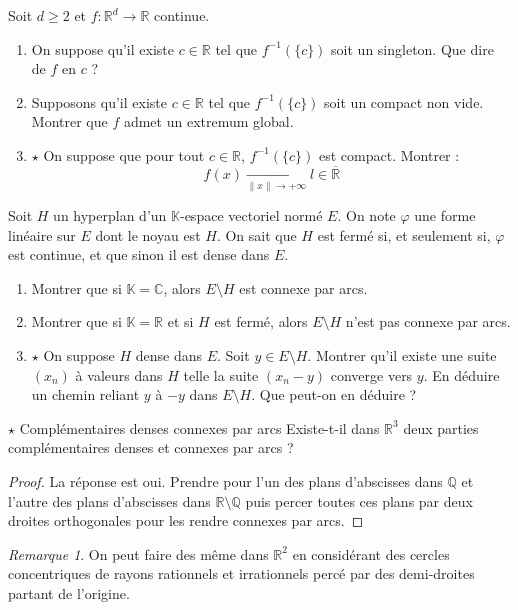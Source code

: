 \documentclass[french,a4paper]{article}
\newcommand{\Q}{\mathbb{Q}}
\newcommand{\R}{\mathbb{R}}
\newcommand{\C}{\mathbb{C}}
\newcommand{\K}{\mathbb{K}}
\newcommand{\inv}{^{-1}}
\theoremstyle{plain}
\theoremstyle{definition}
\theoremstyle{remark}
\newtheorem*{rmq}{Remarque}
\begin{document}
\begin{ex}[Moulin.41]{}
	Soit $d\geqslant 2$ et $f:\R^d\to\R$ continue.
	\begin{enumerate}
		\item On suppose qu'il existe $c\in\R$ tel que $f\inv(\{c\})$ soit un singleton. Que dire de $f$ en $c$ ?
		\item Supposons qu'il existe $c\in\R$ tel que $f\inv(\{c\})$ soit un compact non vide. Montrer que $f$ admet un extremum global.
		\item $\star$ On suppose que pour tout $c\in\R$, $f\inv(\{c\})$ est compact. Montrer : $$f(x)\xrightarrow[\lVert x\rVert\to+\infty]{}l\in\overline{\R}$$
	\end{enumerate}
\end{ex}

\begin{ex}[Moulin.42]{}
	Soit $H$ un hyperplan d'un $\K$-espace vectoriel normé $E$. On note $\varphi$ une forme linéaire sur $E$ dont le noyau est $H$. On sait que $H$ est fermé si, et seulement si, $\varphi$ est continue, et que sinon il est dense dans $E$.
	\begin{enumerate}
		\item Montrer que si $\K=\C$, alors $E\setminus H$ est connexe par arcs.
		\item Montrer que si $\K=\R$ et si $H$ est fermé, alors $E\setminus H$ n'est pas connexe par arcs.
		\item $\star$ On suppose $H$ dense dans $E$. Soit $y\in E\setminus H$. Montrer qu'il existe une suite $(x_n)$ à valeurs dans $H$ telle la suite $(x_n-y)$ converge vers $y$. En déduire un chemin reliant $y$ à $-y$ dans $E\setminus H$. Que peut-on en déduire ?
	\end{enumerate}
\end{ex}

\begin{ex}[Moulin.43]{$\star$ Complémentaires denses connexes par arcs}
	Existe-t-il dans $\R^3$ deux parties complémentaires denses et connexes par arcs ?
\end{ex}
\begin{proof}
	La réponse est oui. Prendre pour l'un des plans d'abscisses dans $\Q$ et l'autre des plans d'abscisses dans $\R\setminus\Q$ puis percer toutes ces plans par deux droites orthogonales pour les rendre connexes par arcs.
\end{proof}
\begin{rmq}
	On peut faire des même dans $\R^2$ en considérant des cercles concentriques de rayons rationnels et irrationnels percé par des demi-droites partant de l'origine.
\end{rmq}
\end{document}
